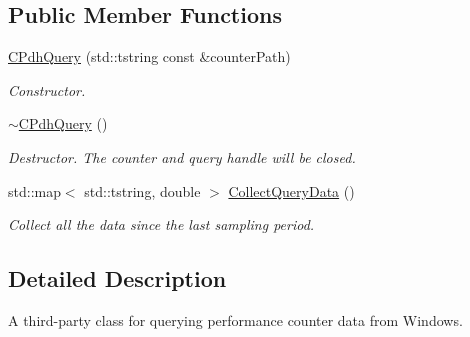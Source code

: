 \subsection*{Public Member Functions}
\begin{DoxyCompactItemize}
\item 
\hypertarget{classxmem_1_1common_1_1win_1_1third__party_1_1_c_pdh_query_a9f68ac7575064085dc05bfdbf4e7b379}{}\hyperlink{classxmem_1_1common_1_1win_1_1third__party_1_1_c_pdh_query_a9f68ac7575064085dc05bfdbf4e7b379}{C\+Pdh\+Query} (std\+::tstring const \&counter\+Path)\label{classxmem_1_1common_1_1win_1_1third__party_1_1_c_pdh_query_a9f68ac7575064085dc05bfdbf4e7b379}

\begin{DoxyCompactList}\small\item\em Constructor. \end{DoxyCompactList}\item 
\hypertarget{classxmem_1_1common_1_1win_1_1third__party_1_1_c_pdh_query_adf839ba4df11e6544e95aafd004273b7}{}\hyperlink{classxmem_1_1common_1_1win_1_1third__party_1_1_c_pdh_query_adf839ba4df11e6544e95aafd004273b7}{$\sim$\+C\+Pdh\+Query} ()\label{classxmem_1_1common_1_1win_1_1third__party_1_1_c_pdh_query_adf839ba4df11e6544e95aafd004273b7}

\begin{DoxyCompactList}\small\item\em Destructor. The counter and query handle will be closed. \end{DoxyCompactList}\item 
\hypertarget{classxmem_1_1common_1_1win_1_1third__party_1_1_c_pdh_query_a529b4c7213b0d43cd7e5aeb0fe4dcb6b}{}std\+::map$<$ std\+::tstring, double $>$ \hyperlink{classxmem_1_1common_1_1win_1_1third__party_1_1_c_pdh_query_a529b4c7213b0d43cd7e5aeb0fe4dcb6b}{Collect\+Query\+Data} ()\label{classxmem_1_1common_1_1win_1_1third__party_1_1_c_pdh_query_a529b4c7213b0d43cd7e5aeb0fe4dcb6b}

\begin{DoxyCompactList}\small\item\em Collect all the data since the last sampling period. \end{DoxyCompactList}\end{DoxyCompactItemize}


\subsection{Detailed Description}
A third-\/party class for querying performance counter data from Windows. 

